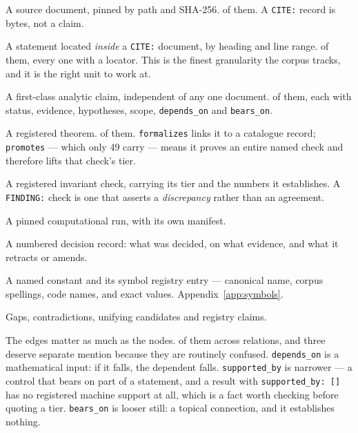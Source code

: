 \begin{description}[leftmargin=1.1em,style=nextline]
\item[\texttt{CITE:}] A source document, pinned by path and SHA-256.
  \CiteDocs{} of them. A \texttt{CITE:} record is bytes, not a claim.
\item[\texttt{DERIV:}] A statement located \emph{inside} a
  \texttt{CITE:} document, by heading and line range.
  \DerivStatements{} of them, every one with a locator. This is the
  finest granularity the corpus tracks, and it is the right unit to
  work at.
\item[\texttt{RESULT:}] A first-class analytic claim, independent of any
  one document. \ResTotal{} of them, each with status, evidence,
  hypotheses, scope, \texttt{depends\_on} and \texttt{bears\_on}.
\item[\texttt{LEAN:}] A registered theorem. \LeanTotal{} of them.
  \texttt{formalizes} links it to a catalogue record;
  \texttt{promotes} --- which only 49 carry --- means it proves an
  entire named check and therefore lifts that check's tier.
\item[\texttt{CHK:}] A registered invariant check, carrying its tier and
  the numbers it establishes. A \texttt{FINDING:} check is one that
  asserts a \emph{discrepancy} rather than an agreement.
\item[\texttt{RUN:}] A pinned computational run, with its own manifest.
\item[\texttt{ADR:}] A numbered decision record: what was decided, on
  what evidence, and what it retracts or amends.
\item[\texttt{CONST:}, \texttt{SYM:}] A named constant and its symbol
  registry entry --- canonical name, corpus spellings, code names, and
  exact values. Appendix~\ref{app:symbols}.
\item[\texttt{G}$n$, \texttt{C}$n$, \texttt{U}$n$, \texttt{R}$n$] Gaps,
  contradictions, unifying candidates and registry claims.
\end{description}

The edges matter as much as the nodes. \GraphEdges{} of them across
\GraphEdgeKinds{} relations, and three deserve separate mention because
they are routinely confused. \texttt{depends\_on} is a mathematical
input: if it falls, the dependent falls. \texttt{supported\_by} is
narrower --- a control that bears on part of a statement, and a result
with \texttt{supported\_by: []} has no registered machine support at
all, which is a fact worth checking before quoting a tier.
\texttt{bears\_on} is looser still: a topical connection, and it
establishes nothing.

